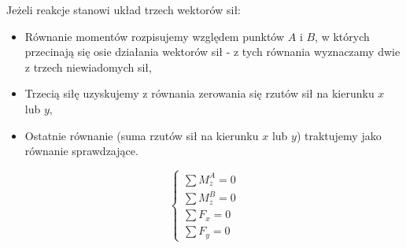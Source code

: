 Jeżeli reakcje stanowi układ trzech wektorów sił:
\begin{itemize}
    \item Równanie momentów rozpisujemy względem punktów $A$ i $B$, w których przecinają się osie działania wektorów sił - z tych równania wyznaczamy dwie z trzech niewiadomych sił,
    \item Trzecią siłę uzyskujemy z równania zerowania się rzutów sił na kierunku $x$ lub $y$,
    \item Ostatnie równanie (suma rzutów sił na kierunku $x$ lub $y$) traktujemy jako równanie sprawdzające.
\end{itemize}

\begin{equation}
    \begin{cases}
        \sum M_z^A = 0 \\
        \sum M_z^B = 0 \\
        \sum F_x = 0 \\
        \sum F_y = 0
    \end{cases}
\end{equation}